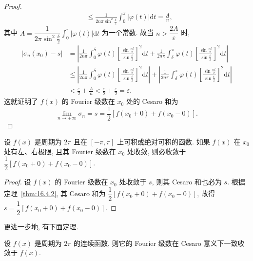 \begin{proof}
\begin{align*}
  &\leqslant\frac{1}{2n\pi\sin^{2}\frac{\delta}{2}}\int_{0}^{\pi}|\varphi(t)|\mathrm{d}t=\frac{A}{n},
\end{align*}
其中 $A=\dfrac{1}{2\pi\sin^{2}\frac{\delta}{2}}\displaystyle\int_{0}^{\pi}|\varphi(t)|\mathrm{d}t$ 为一个常数. 故当 $n>\dfrac{2A}{\varepsilon}$ 时,
\begin{align*}
  \left|\sigma_{n}(x_{0})-s\right|
  &=\left|\frac{1}{2n\pi}\int_{0}^{\delta}\varphi(t)\left[\frac{\sin\frac{nt}{2}}{\sin\frac{t}{2}}\right]^{2}\mathrm{d}t+\frac{1}{2n\pi}\int_{\delta}^{\pi}\varphi(t)\left[\frac{\sin\frac{nt}{2}}{\sin\frac{t}{2}}\right]^{2}\mathrm{d}t\right|\\
  &\leqslant\left|\frac{1}{2n\pi}\int_{0}^{\delta}\varphi(t)\left[\frac{\sin\frac{nt}{2}}{\sin\frac{t}{2}}\right]^{2}\mathrm{d}t\right|+\left|\frac{1}{2n\pi}\int_{\delta}^{\pi}\varphi(t)\left[\frac{\sin\frac{nt}{2}}{\sin\frac{t}{2}}\right]^{2}\mathrm{d}t\right|\\
  &<\frac{\varepsilon}{2}+\frac{A}{n}<\frac{\varepsilon}{2}+\frac{\varepsilon}{2}=\varepsilon.
\end{align*}
这就证明了 $f(x)$ 的 Fourier 级数在 $x_{0}$ 处的 Cesaro 和为
\[
  \lim_{n\to+\infty}\sigma_{n}=s=\frac{1}{2}\left[f(x_{0}+0)+f(x_{0}-0)\right].
\]
\end{proof}

\begin{corollary}\label{cor:16.4.1}
设 $f(x)$ 是周期为 $2\pi$ 且在 $[-\pi,\pi]$ 上可积或绝对可积的函数. 如果 $f(x)$ 在 $x_{0}$ 处有左、右极限, 且其 Fourier 级数在 $x_{0}$ 处收敛, 则必收敛于 $\dfrac{1}{2}[f(x_{0}+0)+f(x_{0}-0)]$.
\end{corollary}

\begin{proof}
设 $f(x)$ 的 Fourier 级数在 $x_{0}$ 处收敛于 $s$, 则其 Cesaro 和也必为 $s$. 根据定理~\ref{thm:16.4.2}, 其 Cesaro 和为 $\dfrac{1}{2}[f(x_{0}+0)+f(x_{0}-0)]$, 故得 $s=\dfrac{1}{2}[f(x_{0}+0)+f(x_{0}-0)]$.
\end{proof}

更进一步地, 有下面定理.

\begin{theorem}[Fej\'er 定理]\label{thm:16.4.3}
设 $f(x)$ 是周期为 $2\pi$ 的连续函数, 则它的 Fourier 级数在 Cesaro 意义下一致收敛于 $f(x)$.
\end{theorem}

